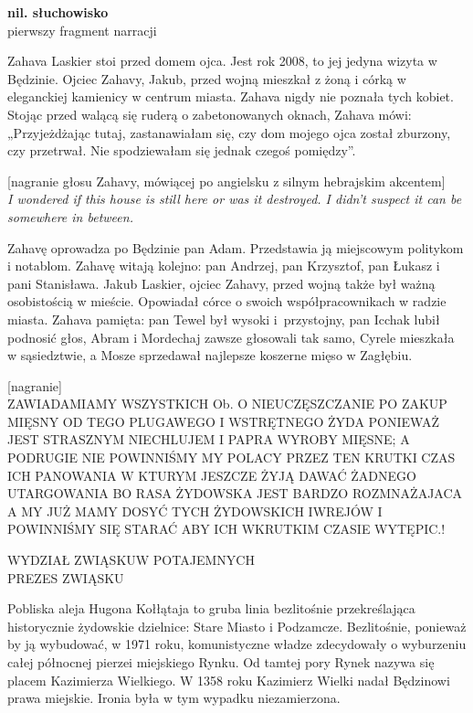 \documentclass[11pt,a4paper,oneside]{article}
\begin{document}
\textbf{nil. słuchowisko}\\
pierwszy fragment narracji

Zahava Laskier stoi przed domem ojca. Jest rok 2008, to jej jedyna wizyta
w Będzinie. Ojciec Zahavy, Jakub, przed wojną mieszkał z żoną i córką
w eleganckiej kamienicy w centrum miasta. Zahava nigdy nie poznała tych kobiet.
Stojąc przed walącą się ruderą o zabetonowanych oknach, Zahava mówi:
„Przyjeżdżając tutaj, zastanawiałam się, czy dom mojego ojca został zburzony,
czy przetrwał. Nie spodziewałam się jednak czegoś pomiędzy”.

[nagranie głosu Zahavy, mówiącej po angielsku z silnym hebrajskim akcentem]\\
\emph{I wondered if this house is still here or was it destroyed. I didn't
suspect it can be somewhere in between.}

Zahavę oprowadza po Będzinie pan Adam. Przedstawia ją miejscowym politykom
i notablom. Zahavę witają kolejno: pan Andrzej, pan Krzysztof, pan Łukasz
i pani Stanisława. Jakub Laskier, ojciec Zahavy, przed wojną także był ważną
osobistością w mieście. Opowiadał córce o swoich współpracownikach w radzie
miasta. Zahava pamięta: pan Tewel był wysoki i~przystojny, pan Icchak lubił
podnosić głos, Abram i Mordechaj zawsze głosowali tak samo, Cyrele mieszkała
w sąsiedztwie, a Mosze sprzedawał najlepsze koszerne mięso w Zagłębiu.

[nagranie]\\
ZAWIADAMIAMY WSZYSTKICH Ob. O NIEUCZĘSZCZANIE PO ZAKUP MIĘSNY OD TEGO PLUGAWEGO
I WSTRĘTNEGO ŻYDA PONIEWAŻ JEST STRASZNYM NIECHLUJEM I PAPRA WYROBY MIĘSNE;
A PODRU\-GIE NIE POWINNIŚMY MY POLACY PRZEZ TEN KRUTKI CZAS ICH PANOWANIA
W KTURYM JESZCZE ŻYJĄ DAWAĆ ŻADNEGO UTARGOWANIA BO RASA ŻYDOWSKA JEST BARDZO
ROZMNAŻAJACA A MY JUŻ MAMY DOSYĆ TYCH ŻYDOWSKICH IWREJÓW I POWINNIŚMY SIĘ
STARAĆ ABY ICH WKRUTKIM CZASIE WYTĘPIC.!

WYDZIAŁ ZWIĄSKUW POTAJEMNYCH \\
PREZES ZWIĄSKU

Pobliska aleja Hugona Kołłątaja to gruba linia bezlitośnie przekreślająca
historycznie żydowskie dzielnice: Stare Miasto i Podzamcze. Bezlitośnie,
ponieważ by ją wybudować, w 1971 roku, komunistyczne władze zdecydowały
o wyburzeniu całej północnej pierzei miejskiego Rynku. Od tamtej pory Rynek
nazywa się placem Kazimierza Wielkiego. W 1358 roku Kazimierz Wielki nadał
Będzinowi prawa miejskie. Ironia była w tym wypadku niezamierzona.
\end{document}
